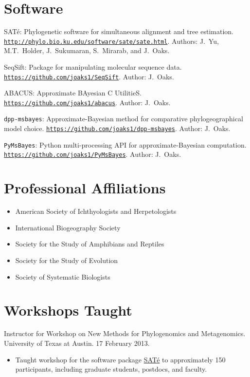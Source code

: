 \documentclass[10pt]{article}
\newenvironment{myItemize}{
  \begin{itemize}
    \setlength{\leftskip}{-4mm}
    \setlength{\itemsep}{0.25em}
    \setlength{\parskip}{0pt}
    \setlength{\parsep}{0.5em}}
  {\end{itemize}}
\newcommand{\myHangIndent}{\hangindent=5mm}
\begin{document}
\section*{Software}
\myHangIndent
{SAT}\'{e}: Phylogenetic software for simultaneous alignment and tree
estimation.
\href{http://phylo.bio.ku.edu/software/sate/sate.html}
{\tt http://phylo.bio.ku.edu/software/sate/sate.html}.
Authors: J.\ Yu, M.T.\ Holder, J.\ Sukumaran, S.\ Mirarab, and J.\ Oaks.

\myHangIndent
SeqSift: Package for manipulating molecular sequence data.
\href{https://github.com/joaks1/SeqSift}{\tt https://github.com/joaks1/SeqSift}.
Author: J.\ Oaks.

\myHangIndent
ABACUS: Approximate BAyesian C UtilitieS.
\href{https://github.com/joaks1/abacus}{\tt https://github.com/joaks1/abacus}.
Author: J.\ Oaks.

\myHangIndent
\texttt{dpp-msbayes}: Approximate-Bayesian method for comparative
phylogeographical model choice.
\href{https://github.com/joaks1/dpp-msbayes}{\tt https://github.com/joaks1/dpp-msbayes}.
Author: J.\ Oaks.

\myHangIndent
\texttt{PyMsBayes}: Python multi-processing API for approximate-Bayesian computation.
\href{https://github.com/joaks1/PyMsBayes}{\tt https://github.com/joaks1/PyMsBayes}.
Author: J.\ Oaks.

\section*{Professional Affiliations}
\begin{myItemize}
\item American Society of Ichthyologists and Herpetologists
\item International Biogeography Society
\item Society for the Study of Amphibians and Reptiles
\item Society for the Study of Evolution
\item Society of Systematic Biologists
\end{myItemize}

\section*{Workshops Taught}
\myHangIndent
Instructor for Workshop on New Methods for Phylogenomics and Metagenomics.
University of Texas at Austin.
17 February 2013. \\
\begin{itemize}
    \setlength{\leftskip}{0em}
    \setlength{\itemsep}{0.25em}
    \setlength{\parskip}{-1em}
    \setlength{\parsep}{0.5em}
\item Taught workshop for the software package
    \href{http://phylo.bio.ku.edu/software/sate/sate.html}{{SAT}\'{e}} to
approximately 150 participants, including graduate students, postdocs, and
faculty.
\end{itemize}
\end{document}
